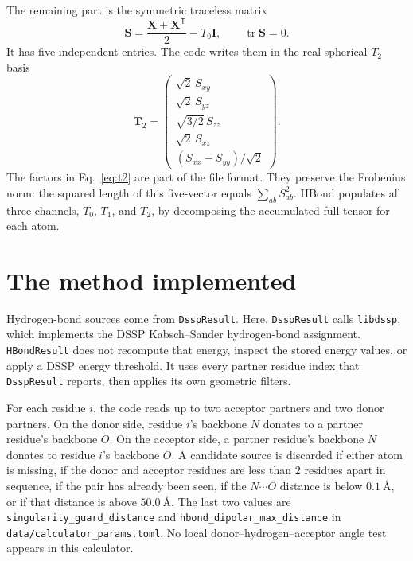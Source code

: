 \documentclass[11pt]{article}
\begin{document}
The remaining part is the symmetric traceless matrix
\begin{equation}
  \bm S =
  \frac{\bm X+\bm X^{\mathsf T}}{2} - T_0\bm I,
  \qquad \operatorname{tr}\bm S=0 .
  \label{eq:s}
\end{equation}
It has five independent entries. The code writes them in the real spherical
\(T_2\) basis
\begin{equation}
  \bm T_2 =
  \begin{pmatrix}
    \sqrt{2}\,S_{xy}\\
    \sqrt{2}\,S_{yz}\\
    \sqrt{3/2}\,S_{zz}\\
    \sqrt{2}\,S_{xz}\\
    (S_{xx}-S_{yy})/\sqrt{2}
  \end{pmatrix}.
  \label{eq:t2}
\end{equation}
The factors in Eq.~\eqref{eq:t2} are part of the file format. They preserve
the Frobenius norm: the squared length of this five-vector equals
\(\sum_{ab}S_{ab}^2\). HBond populates all three channels, \(T_0\), \(T_1\),
and \(T_2\), by decomposing the accumulated full tensor for each atom.

\section{The method implemented}

Hydrogen-bond sources come from \texttt{DsspResult}. Here,
\texttt{DsspResult} calls \texttt{libdssp}, which implements the DSSP
Kabsch--Sander hydrogen-bond assignment. \texttt{HBondResult} does not
recompute that energy, inspect the stored energy values, or apply a DSSP
energy threshold. It uses every partner residue index that
\texttt{DsspResult} reports, then applies its own geometric filters.

For each residue \(i\), the code reads up to two acceptor partners and two
donor partners. On the donor side, residue \(i\)'s backbone \(N\) donates to a
partner residue's backbone \(O\). On the acceptor side, a partner residue's
backbone \(N\) donates to residue \(i\)'s backbone \(O\). A candidate source is
discarded if either atom is missing, if the donor and acceptor residues are
less than \(\num{2}\) residues apart in sequence, if the pair has already been
seen, if the \(N\cdots O\) distance is below \(\SI{0.1}{\angstrom}\), or if
that distance is above \(\SI{50.0}{\angstrom}\). The last two values are
\texttt{singularity\_guard\_distance} and
\texttt{hbond\_dipolar\_max\_distance} in
\texttt{data/calculator\_params.toml}. No local donor--hydrogen--acceptor
angle test appears in this calculator.
\end{document}
